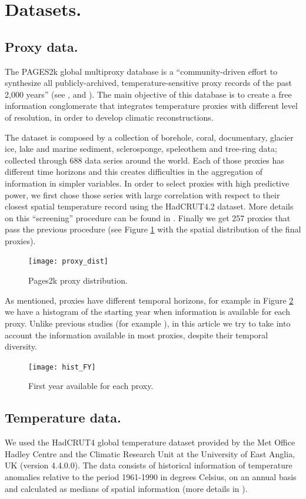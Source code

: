 \documentclass[11pt]{amsart}
\theoremstyle{plain}
\theoremstyle{definition}
\theoremstyle{remark}
\begin{document}
\section{Datasets.}
\label{sec:data}

\subsection{Proxy data.}
The PAGES2k global multiproxy database is a ``community-driven effort to
synthesize all publicly-archived, temperature-sensitive proxy records of the
past 2,000 years'' (see \cite{Kaufman2014}, \cite{PAGES2KConsortium2013} and \cite{PAGES2kConsortium2017}). The main objective of this database is
to create a free information conglomerate that integrates temperature proxies
with different level of resolution, in order to develop climatic
reconstructions.

The dataset is composed by a collection of borehole, coral, documentary, glacier
ice, lake and marine 
sediment, sclerosponge, speleothem and tree-ring data; collected through 688
data series around the world. Each of those proxies
has different time horizons and this creates difficulties in the aggregation of
information in simpler variables.  In order to select proxies with high
predictive power, we first chose those series with large correlation with respect to
their closest spatial temperature record using the HadCRUT4.2 dataset. More
details on this ``screening'' procedure can be found in \cite{Emile-Geay2015}. Finally we get 257 proxies
that pass the previous procedure (see Figure \ref{fig:proxy} with the spatial
distribution of the final proxies).   
\begin{figure}
  \centering
  \texttt{[image: proxy\_dist]}
  \caption{Pages2k proxy distribution.}
  \label{fig:proxy}
\end{figure}
As mentioned, proxies have different temporal horizons, for example in Figure
\ref{fig:histofirstyear} we have a histogram of the starting year when
information is available for each proxy. Unlike previous studies (for example \cite{Barboza2014}), in this article we try to take into account the information available in most proxies, despite their temporal diversity.
\begin{figure}
  \centering
  \texttt{[image: hist\_FY]}
  \caption{First year available for each proxy.}
  \label{fig:histofirstyear}
\end{figure}

\subsection{Temperature data.}
We used the HadCRUT4 global temperature dataset provided by the Met Office Hadley
Centre and the Climatic Research Unit at the University of East Anglia, UK (version 4.4.0.0). The
data consists of historical information of temperature anomalies relative to the
period 1961-1990 in degrees Celsius, on an annual basis and calculated as
medians of spatial information (more details in \cite{Morice2012}).
\end{document}
